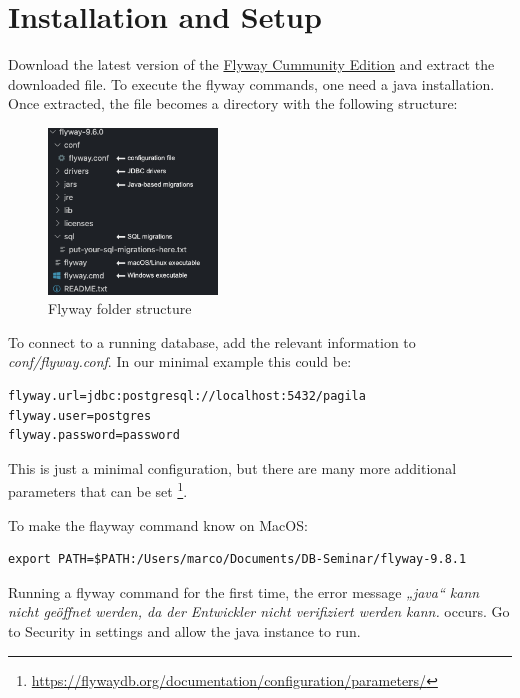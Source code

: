 \section{Installation and Setup}
%

%
Download the latest version of the \href{https://flywaydb.org/download/community}{Flyway Cummunity Edition} and extract the downloaded file. To execute the flyway commands, one need a java installation.
Once extracted, the file becomes a directory with the following structure:

\begin{figure}[H]
    \centering
    \includegraphics[width=0.4\textwidth]{./chapters/intro_flyway/images/flyway_folder_structure}
   \caption[Flyway folder structure - Source: Own illustration]{Flyway folder structure}
    \label{fig:flyway_folder_structure}
\end{figure}


%
To connect to a running database, add the relevant information to \textit{conf/flyway.conf}.
In our minimal example this could be:

\begin{lstlisting}[caption=Minimal configuration]
flyway.url=jdbc:postgresql://localhost:5432/pagila
flyway.user=postgres
flyway.password=password
\end{lstlisting}

This is just a minimal configuration, but there are many more additional parameters that can be set \footnote{\url{https://flywaydb.org/documentation/configuration/parameters/}}.


%
To make the flayway command know on MacOS:
\begin{lstlisting}[caption=Minimal configuration]
export PATH=$PATH:/Users/marco/Documents/DB-Seminar/flyway-9.8.1
\end{lstlisting}
Running a flyway command for the first time, the error message \textit{„java“ kann nicht geöffnet werden, da der Entwickler nicht verifiziert werden kann.} occurs. Go to Security in settings and allow the java instance to run.

\newpage
